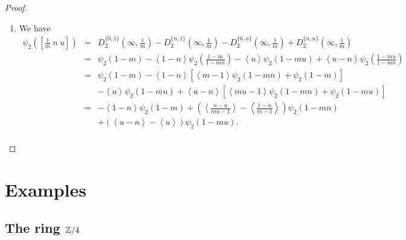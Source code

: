 \documentclass[12pt]{amsart}
\theoremstyle{definition}
\newcommand{\Z}{\Bbb{Z}}
\newcommand{\scyc}[1]{\left[ #1 \right]} %
\newcommand{\suss}[2]{\psi_{#1}\left( #2\right)}
\newcommand{\<}{\langle}
\renewcommand{\>}{\rangle}
\newcommand{\an}[1]{\left\langle{#1}\right\rangle}
\newcommand{\pf}[1]{\left\langle\!\left\langle{#1}\right\rangle\!\right\rangle}
\begin{document}
\begin{proof}
\begin{enumerate}
\begin{eqnarray*}
&=&\left(-\pf{u}+\pf{\frac{1-mn}{1-n}}+\an{\frac{1-mn}{1-n}}\pf{\frac{u-n}{1-n}}\right)\suss{1}{1-mu}\\
&&+\an{1-m}\pf{\frac{1-mn}{1-n}}\suss{1}{1-m}+\an{1-n}\pf{\frac{u-n}{1-n}}\suss{1}{1-mn}\\
&&\mbox{ (using $\pf{a}\suss{1}{b}=\pf{a}\suss{1}{b^{-1}}$)}\\
&=& \left(\an{\frac{1-mn}{u-n}}-\an{u}\right)\suss{1}{1-mu}+\an{1-m}\pf{\frac{1-mn}{1-n}}\suss{1}{1-m}\\
&&+(\an{u-n}-\an{1-n})\suss{1}{1-mn}\\
\end{eqnarray*}
as required.
\item We have
\begin{eqnarray*}
\suss{2}{\scyc{\frac{1}{m}\  n\  u}}&=& D_2^{\{0,1\}}\left(\infty,\frac{1}{m}\right)-D_2^{\{ n,1\}}\left(\infty,\frac{1}{m}\right) -D_2^{\{0,u\}}\left(\infty,\frac{1}{m}\right)
+D_2^{\{n,u\}}\left(\infty,\frac{1}{m}\right) \\
&=&\suss{2}{1-m}-\an{1-n}\suss{2}{\frac{1-m}{1-mn}}-\an{u}\suss{2}{1-mu}+\an{u-n}\suss{2}{\frac{1-mu}{1-mn}}\\
&=&\suss{2}{1-m}-\an{1-n}\left[\an{m-1}\suss{2}{1-mn}+\suss{2}{1-m}\right]\\
&&-\an{u}\suss{2}{1-mu}+\an{u-n}\left[\an{mu-1}\suss{2}{1-mn}+\suss{2}{1-mu}\right]\\
&=&-\an{1-n}\suss{2}{1-m}+\left(\an{\frac{u-n}{mu-1}}-\an{\frac{1-n}{m-1}}\right)\suss{2}{1-mn}\\
&&+\left(\an{u-n}-\an{u}\right)\suss{2}{1-mu}.\\
\end{eqnarray*}


\end{enumerate}
\end{proof}

\section{Examples}\label{sec:exa}
\subsection{The ring $\Z/4$}

\end{document}
